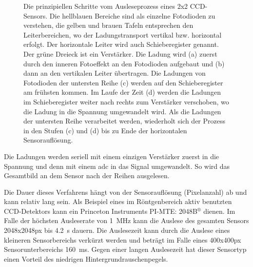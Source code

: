\begin{figure}[H]
    \caption{Die prinzipiellen Schritte vom Ausleseprozess eines 2x2 CCD-Sensors. Die hellblauen Bereiche sind als einzelne Fotodioden zu verstehen, die gelben und brauen Tafeln entsprechen den Leiterbereichen, wo der Ladungstransport vertikal bzw. horizontal erfolgt. Der horizontale Leiter wird auch Schieberegister genannt. Der grüne Dreieck ist ein Verstärker. Die Ladung wird (a) zuerst durch den inneren Fotoeffekt an den Fotodioden aufgebaut und (b) dann an den vertikalen Leiter übertragen. Die Ladungen von Fotodioden der untersten Reihe (c) werden auf den Schieberegister am frühsten kommen. Im Laufe der Zeit (d) werden die Ladungen im Schieberegister weiter nach rechts zum Verstärker verschoben, wo die Ladung in die Spannung umgewandelt wird. Als die Ladungen der untersten Reihe verarbeitet werden, wiederholt sich der Prozess in den Stufen (c) und (d) bis zu Ende der horizontalen Sensorauflösung.}
    \label{fig:ccd_scheme}
\end{figure}
\noindent
Die Ladungen werden seriell mit einem einzigen Verstärker zuerst in die Spannung und denn mit einem \gls{adc} in das Signal umgewandelt. So wird das Gesamtbild an dem Sensor nach der Reihen ausgelesen.

\noindent
Die Dauer dieses Verfahrens hängt von der Sensorauflösung (Pixelanzahl) ab und kann relativ lang sein. Als Beispiel eines im Röntgenbereich aktiv benutzten CCD-Detektors kann ein Princeton Instruments
PI-MTE: 2048B$^{\text{®}}$ dienen. Im Falle der höchsten Ausleserate von \SI{1}{\mega\hertz} \cite[s. 81, Readout charakterstik]{mte-manual} kann die Auslese des gesamten Sensors 2048x2048px bis \SI{4,2}{\second} dauern. Die Auslesezeit kann  durch die Auslese eines kleineren Sensorbereichs verkürzt werden und beträgt im Falle eines 400x400px Sensorunterbereichs \SI{160}{\milli\second}. Gegen einer langen Auslesezeit hat dieser Sensortyp einen Vorteil des niedrigen Hintergrundrauschenpegels.

